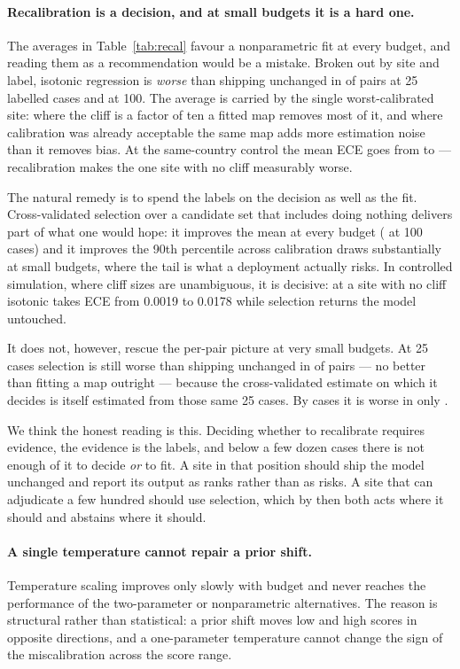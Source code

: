 \paragraph{Recalibration is a decision, and at small budgets it is a hard one.}
The averages in Table~\ref{tab:recal} favour a nonparametric fit at every
budget, and reading them as a recommendation would be a mistake.  Broken out by
site and label, isotonic regression is \emph{worse} than shipping unchanged in
 of  pairs at 25 labelled cases and
 at 100.  The average is carried by the single
worst-calibrated site: where the cliff is a factor of ten a fitted map removes
most of it, and where calibration was already acceptable the same map adds more
estimation noise than it removes bias.  At the same-country control the mean ECE
goes from  to  --- recalibration makes
the one site with no cliff measurably worse.

The natural remedy is to spend the labels on the decision as well as the fit.
Cross-validated selection over a candidate set that includes doing nothing
delivers part of what one would hope: it improves the mean at every budget
( at 100 cases) and it improves the 90th percentile across
calibration draws substantially at small budgets, where the tail is what a
deployment actually risks.  In controlled simulation, where cliff sizes are
unambiguous, it is decisive: at a site with no cliff isotonic takes ECE from
0.0019 to 0.0178 while selection returns the model untouched.

It does not, however, rescue the per-pair picture at very small budgets.  At 25
cases selection is still worse than shipping unchanged in
 of  pairs --- no better than fitting a map
outright --- because the cross-validated estimate on which it decides is itself
estimated from those same 25 cases.  By  cases it is worse
in only .

We think the honest reading is this.  Deciding whether to recalibrate requires
evidence, the evidence is the labels, and below a few dozen cases there is not
enough of it to decide \emph{or} to fit.  A site in that position should ship
the model unchanged and report its output as ranks rather than as risks.  A site
that can adjudicate a few hundred should use selection, which by then both acts
where it should and abstains where it should.

\paragraph{A single temperature cannot repair a prior shift.}
Temperature scaling improves only slowly with budget and never reaches the
performance of the two-parameter or nonparametric alternatives.  The reason is
structural rather than statistical: a prior shift moves low and high scores in
opposite directions, and a one-parameter temperature cannot change the sign of
the miscalibration across the score range.

